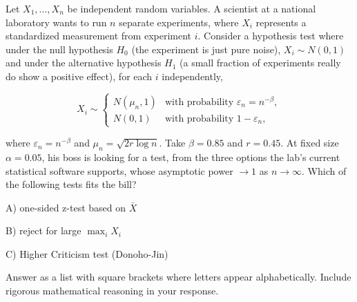 Let $X_1, \ldots, X_n$ be independent random variables. A scientist at a national laboratory wants to run $n$ separate experiments, where $X_i$ represents a standardized measurement from experiment $i$. Consider a hypothesis test where under the null hypothesis $H_0$ (the experiment is just pure noise), $X_i \sim N(0,1)$ and under the alternative hypothesis $H_1$ (a small fraction of experiments really do show a positive effect), for each $i$ independently,

$$
X_i \sim \begin{cases}
N(\mu_n,1) & \text{with probability } \varepsilon_n=n^{-\beta}, \\
N(0,1) & \text{with probability } 1-\varepsilon_n,
\end{cases}
$$

where $\varepsilon_n=n^{-\beta}$ and $\mu_n=\sqrt{2r\log n}$. Take $\beta=0.85$ and $r=0.45$. At fixed size $\alpha=0.05$, his boss is looking for a test, from the three options the lab's current statistical software supports, whose asymptotic power $\to 1$ as $n\to\infty$. Which of the following tests fits the bill?

A) one-sided z-test based on $\bar X$

B) reject for large $\max_i X_i$

C) Higher Criticism test (Donoho-Jin)

Answer as a list with square brackets where letters appear alphabetically. Include rigorous mathematical reasoning in your response.
